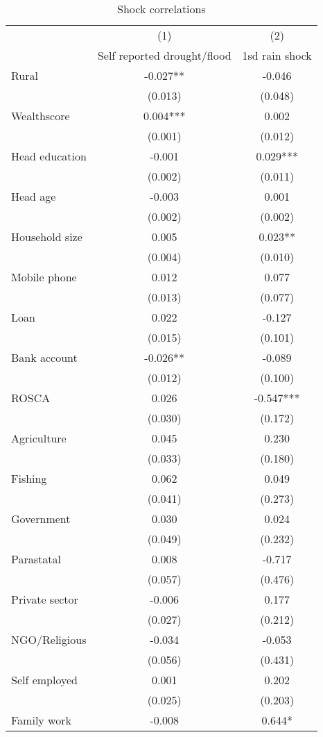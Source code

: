 
\begin{table}
\centering \caption{Shock correlations} \label{shock corr}
\def\arraystretch{0.7}
\begin{tabular}{lcc} \hline
 & (1) & (2) \\
 & Self reported drought/flood  & 1sd rain shock \\ \hline
Rural& -0.027** & -0.046 \\
 & (0.013) &(0.048) \\
Wealthscore & 0.004*** & 0.002 \\
 & (0.001) & (0.012) \\
Head education & -0.001 & 0.029*** \\
 & (0.002) & (0.011)  \\
Head age & -0.003 & 0.001 \\
 & (0.002) & (0.002) \\
Household size & 0.005  & 0.023** \\
 & (0.004) & (0.010) \\
Mobile phone & 0.012 & 0.077 \\
 & (0.013) & (0.077)\\
Loan & 0.022 & -0.127 \\
 & (0.015) & (0.101) \\
Bank account  & -0.026**  & -0.089\\
 & (0.012)  & (0.100)  \\
ROSCA & 0.026 & -0.547*** \\
 & (0.030)  & (0.172)  \\
Agriculture & 0.045 & 0.230  \\
 & (0.033) & (0.180)  \\
Fishing  & 0.062 & 0.049  \\
 & (0.041) & (0.273) \\
Government  & 0.030 & 0.024 \\
 & (0.049)& (0.232)  \\
Parastatal & 0.008 & -0.717 \\
 & (0.057)  & (0.476) \\
Private sector  & -0.006 & 0.177 \\
 & (0.027) & (0.212) \\
NGO/Religious & -0.034 & -0.053\\
 & (0.056)  & (0.431) \\
Self employed & 0.001 & 0.202\\
 & (0.025)  & (0.203) \\
Family work& -0.008  & 0.644*\\

\end{tabular}
\end{table}
